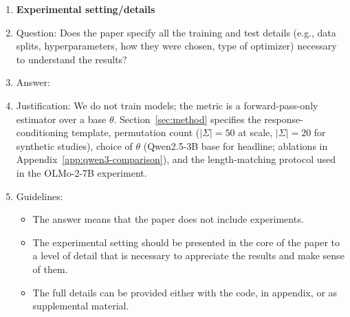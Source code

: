 \begin{enumerate}
\item {\bf Experimental setting/details}
    \item[] Question: Does the paper specify all the training and test details (e.g., data splits, hyperparameters, how they were chosen, type of optimizer) necessary to understand the results?
    \item[] Answer: \answerYes{}
    \item[] Justification: We do not train models; the metric is a forward-pass-only estimator over a base $\theta$. Section~\ref{sec:method} specifies the response-conditioning template, permutation count ($|\Sigma|=50$ at scale, $|\Sigma|=20$ for synthetic studies), choice of $\theta$ (Qwen2.5-3B base for headline; ablations in Appendix~\ref{app:qwen3-comparison}), and the length-matching protocol used in the OLMo-2-7B experiment.
    \item[] Guidelines:
    \begin{itemize}
        \item The answer \answerNA{} means that the paper does not include experiments.
        \item The experimental setting should be presented in the core of the paper to a level of detail that is necessary to appreciate the results and make sense of them.
        \item The full details can be provided either with the code, in appendix, or as supplemental material.
    \end{itemize}


\end{enumerate}
